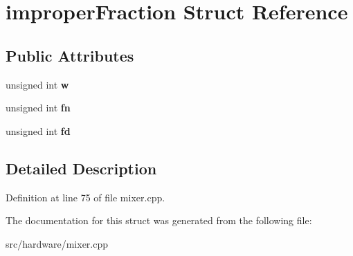 \hypertarget{structimproperFraction}{\section{improper\-Fraction Struct Reference}
\label{structimproperFraction}
}
\subsection*{Public Attributes}
\begin{DoxyCompactItemize}
\item 
\hypertarget{structimproperFraction_a79ffb0d5d4b535ceb6c2620850b44672}{unsigned int {\bfseries w}}\label{structimproperFraction_a79ffb0d5d4b535ceb6c2620850b44672}

\item 
\hypertarget{structimproperFraction_af96a40ff6b332bceecc14165bbe69a70}{unsigned int {\bfseries fn}}\label{structimproperFraction_af96a40ff6b332bceecc14165bbe69a70}

\item 
\hypertarget{structimproperFraction_aa6b4bf618101377f1182dc333b91190b}{unsigned int {\bfseries fd}}\label{structimproperFraction_aa6b4bf618101377f1182dc333b91190b}

\end{DoxyCompactItemize}


\subsection{Detailed Description}


Definition at line 75 of file mixer.\-cpp.



The documentation for this struct was generated from the following file\-:\begin{DoxyCompactItemize}
\item 
src/hardware/mixer.\-cpp\end{DoxyCompactItemize}
